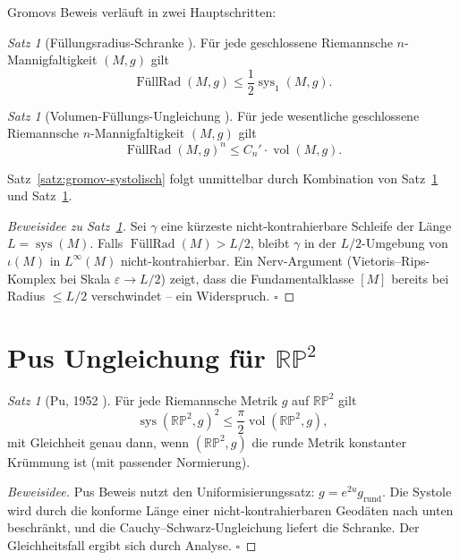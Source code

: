 \documentclass[12pt,a4paper]{amsart}
\theoremstyle{definition}
\theoremstyle{remark}
\newtheorem{satz}[theorem]{Satz}
\DeclareMathOperator{\sys}{sys}
\DeclareMathOperator{\FillRad}{FüllRad}
\DeclareMathOperator{\vol}{vol}
\newcommand{\RP}{\mathbb{RP}}
\begin{document}
Gromovs Beweis verläuft in zwei Hauptschritten:

\begin{satz}[Füllungsradius-Schranke \cite{Gromov1983}]
\label{satz:fuellrad-sys}
Für jede geschlossene Riemannsche $n$-Mannigfaltigkeit $(M,g)$ gilt
\[
  \FillRad(M,g) \le \frac{1}{2} \sys_1(M,g).
\]
\end{satz}

\begin{satz}[Volumen-Füllungs-Ungleichung \cite{Gromov1983}]
\label{satz:vol-fuellrad}
Für jede wesentliche geschlossene Riemannsche $n$-Mannigfaltigkeit $(M,g)$ gilt
\[
  \FillRad(M,g)^n \le C_n' \cdot \vol(M,g).
\]
\end{satz}

Satz~\ref{satz:gromov-systolisch} folgt unmittelbar durch Kombination von
Satz~\ref{satz:fuellrad-sys} und Satz~\ref{satz:vol-fuellrad}.

\begin{proof}[Beweisidee zu Satz~\ref{satz:fuellrad-sys}]
Sei $\gamma$ eine kürzeste nicht-kontrahierbare Schleife der Länge $L = \sys(M)$.
Falls $\FillRad(M) > L/2$, bleibt $\gamma$ in der $L/2$-Umgebung von
$\iota(M)$ in $L^\infty(M)$ nicht-kontrahierbar.  Ein Nerv-Argument
(Vietoris--Rips-Komplex bei Skala $\varepsilon \to L/2$) zeigt, dass die
Fundamentalklasse $[M]$ bereits bei Radius $\le L/2$ verschwindet --
ein Widerspruch. $\square$
\end{proof}

\section{Pus Ungleichung für $\RP^2$}

\begin{satz}[Pu, 1952 \cite{Pu1952}]
Für jede Riemannsche Metrik $g$ auf $\RP^2$ gilt
\[
  \sys(\RP^2, g)^2 \le \frac{\pi}{2} \vol(\RP^2, g),
\]
mit Gleichheit genau dann, wenn $(\RP^2, g)$ die runde Metrik konstanter
Krümmung ist (mit passender Normierung).
\end{satz}

\begin{proof}[Beweisidee]
Pus Beweis nutzt den Uniformisierungssatz: $g = e^{2u} g_{\mathrm{rund}}$.
Die Systole wird durch die konforme Länge einer nicht-kontrahierbaren Geodäten
nach unten beschränkt, und die Cauchy--Schwarz-Ungleichung liefert die Schranke.
Der Gleichheitsfall ergibt sich durch Analyse. $\square$
\end{proof}
\end{document}
